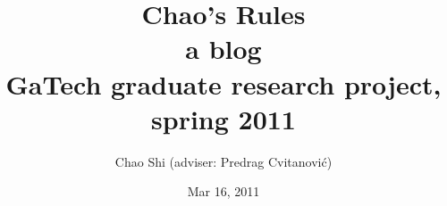
        \title{
\Huge
Chao's Rules
\\
\huge
a blog
\\
{\LARGE GaTech graduate research project, spring 2011}
        \\\vspace{1.0cm}
        }\author{
Chao Shi
(adviser: Predrag Cvitanovi\'{c})
    }
        \date{Mar 16, 2011} \Private{\date{\today}}
